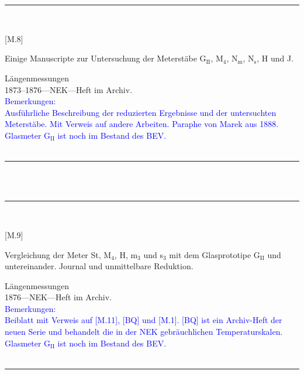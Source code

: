 \\
\vspace*{-2.5pt}\\
\parbox{\textwidth}{%
\rule{\textwidth}{1pt}\vspace*{-3mm}\\
\begin{minipage}[t]{0.2\textwidth}\vspace{0pt}
\Huge\rule[-4mm]{0cm}{1cm}[M.8]
\end{minipage}
\hfill
\begin{minipage}[t]{0.8\textwidth}\vspace{0pt}
\large Einige Manuscripte zur Untersuchung der Meterstäbe G$_\mathrm{II}$, M$_\mathrm{4}$, N$_\mathrm{m}$, N$_\mathrm{s}$, H und J.\rule[-2mm]{0mm}{2mm}
\end{minipage}
{\footnotesize\flushright
Längenmessungen\\
}
1873--1876\quad---\quad NEK\quad---\quad Heft im Archiv.\\
\textcolor{blue}{Bemerkungen:\\{}
Ausführliche Beschreibung der reduzierten Ergebnisse und der untersuchten Meterstäbe. Mit Verweis auf andere Arbeiten. Paraphe von Marek aus 1888.\\{}
Glasmeter G$_\mathrm{II}$ ist noch im Bestand des BEV.\\{}
}
\\[-15pt]
\rule{\textwidth}{1pt}
}
\\
\vspace*{-2.5pt}\\
\parbox{\textwidth}{%
\rule{\textwidth}{1pt}\vspace*{-3mm}\\
\begin{minipage}[t]{0.2\textwidth}\vspace{0pt}
\Huge\rule[-4mm]{0cm}{1cm}[M.9]
\end{minipage}
\hfill
\begin{minipage}[t]{0.8\textwidth}\vspace{0pt}
\large Vergleichung der Meter St, M$_\mathrm{4}$, H, m$_\mathrm{3}$ und s$_\mathrm{3}$ mit dem Glasprototipe G$_\mathrm{II}$ und untereinander. Journal und unmittelbare Reduktion.\rule[-2mm]{0mm}{2mm}
\end{minipage}
{\footnotesize\flushright
Längenmessungen\\
}
1876\quad---\quad NEK\quad---\quad Heft im Archiv.\\
\textcolor{blue}{Bemerkungen:\\{}
Beiblatt mit Verweis auf [M.11], [BQ] und [M.1]. [BQ] ist ein Archiv-Heft der neuen Serie und behandelt die in der NEK gebräuchlichen Temperaturskalen.\\{}
Glasmeter G$_\mathrm{II}$ ist noch im Bestand des BEV.\\{}
}
\\[-15pt]
\rule{\textwidth}{1pt}
}
